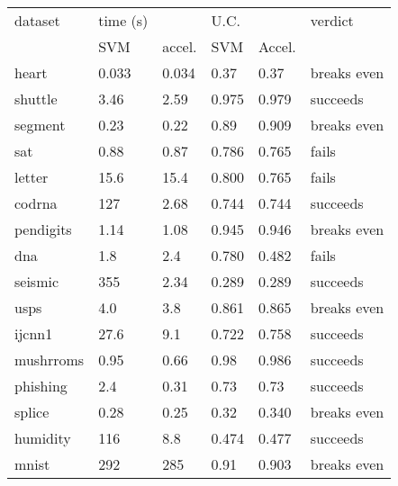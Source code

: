 \begin{tabular}{|l|ll|ll|l|}
	\hline
dataset & time (s) & & U.C. & & verdict \\
 & SVM & accel. & SVM & Accel. & \\
	\hline
heart & 0.033 & 0.034 & 0.37 & 0.37 & breaks even \\
shuttle & 3.46 & 2.59 & 0.975 & 0.979 & succeeds \\
segment & 0.23 & 0.22 & 0.89 & 0.909 & breaks even \\
	sat & 0.88 & 0.87 & 0.786 & 0.765 & fails \\
	letter & 15.6 & 15.4 & 0.800 & 0.765 & fails \\
	codrna & 127 & 2.68 & 0.744 & 0.744 & succeeds \\
	pendigits & 1.14 & 1.08 & 0.945 & 0.946 & breaks even \\
	dna & 1.8 & 2.4 & 0.780 & 0.482 & fails \\
	seismic & 355 & 2.34 & 0.289 & 0.289 & succeeds \\
	usps & 4.0 & 3.8 & 0.861 & 0.865 & breaks even \\
	ijcnn1 & 27.6 & 9.1 & 0.722 & 0.758 & succeeds \\
	mushrroms & 0.95 & 0.66 & 0.98 & 0.986 & succeeds \\
	phishing & 2.4 & 0.31 & 0.73 & 0.73 & succeeds \\
	splice & 0.28 & 0.25 & 0.32 & 0.340 & breaks even \\
	humidity & 116 & 8.8 & 0.474 & 0.477 & succeeds \\
	mnist & 292 & 285 & 0.91 & 0.903 & breaks even \\
	\hline
\end{tabular}
